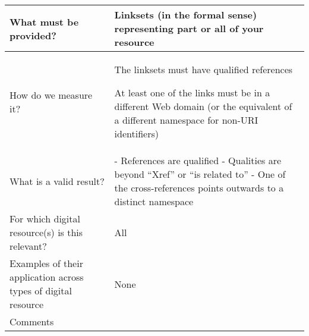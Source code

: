 \documentclass[english]{article}
\begin{document}
\begin{longtable}{|p{5cm}|p{9cm}|}
  
\\



\hline
What must be provided? &  


Linksets (in the formal sense) representing part or all of your resource



\\



\hline
How do we measure it? &  


The linksets must have qualified references

At least one of the links must be in a different Web domain (or the equivalent of a different namespace for non-URI identifiers)



\\



\hline
What is a valid result? &  


- References are qualified\newline
- Qualities are beyond “Xref” or “is related to”\newline
- One of the cross-references points outwards to a distinct namespace\newline


\\



\hline
For which digital resource(s) is this relevant? &  All\\



\hline
Examples of their application across types of digital resource &  None

\\



\hline

Comments & 


\\
\hline

\end{longtable}



\newpage
\end{document}
